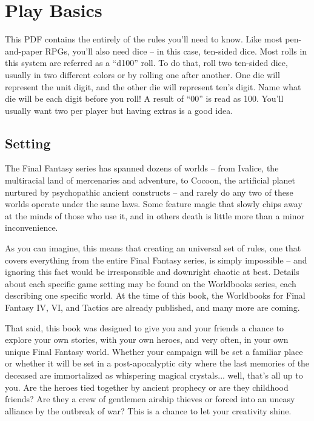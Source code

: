 \section{Play Basics}
\begin{multicols}{2}
This PDF contains the entirely of the rules
you'll need to know. Like most pen-and-paper
RPGs, you'll also need dice – in this case, ten-sided
dice. Most rolls in this system are referred as a
“d100” roll. To do that, roll two ten-sided dice,
usually in two different colors or by rolling one
after another. One die will represent the unit digit,
and the other die will represent ten's digit. Name
what die will be each digit before you roll! A result
of “00” is read as 100. You’ll usually want two per
player but having extras is a good idea.

\subsection{Setting}
The Final Fantasy series has spanned
dozens of worlds – from Ivalice, the multiracial
land of mercenaries and adventure, to Cocoon, the
artificial planet nurtured by psychopathic ancient
constructs – and rarely do any two of these worlds
operate under the same laws. Some feature magic
that slowly chips away at the minds of those who
use it, and in others death is little more than a
minor inconvenience.

As you can imagine, this means that creating
an universal set of rules, one that covers
everything from the entire Final Fantasy series, is
simply impossible – and ignoring this fact would
be irresponsible and downright chaotic at best.
Details about each specific game setting may be
found on the Worldbooks series, each describing
one specific world. At the time of this book, the
Worldbooks for Final Fantasy IV, VI, and Tactics are
already published, and many more are coming.

That said, this book was designed to give you
and your friends a chance to explore your own
stories, with your own heroes, and very often, in
your own unique Final Fantasy world. Whether
your campaign will be set a familiar place or
whether it will be set in a post-apocalyptic city
where the last memories of the deceased are
immortalized as whispering magical crystals...
well, that’s all up to you. Are the heroes tied
together by ancient prophecy or are they
childhood friends? Are they a crew of gentlemen
airship thieves or forced into an uneasy alliance by
the outbreak of war? This is a chance to let your
creativity shine.


\end{multicols}
